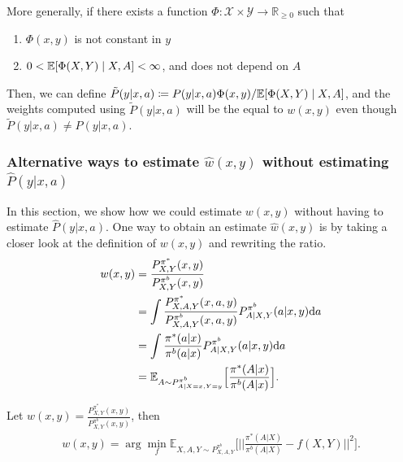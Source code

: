 More generally, if there exists a function $\Phi: \mathcal{X}\times \mathcal{Y} \rightarrow \mathbb{R}_{\geq0}$ such that 
\begin{enumerate}
    \item $\Phi(x, y)$ is not constant in $y$
    \item $0<\mathbb{E}[\Phi(X,Y) \mid X, A]< \infty$, and does not depend on $A$
\end{enumerate}
Then, we can define $\tilde{P}(y|x, a) \coloneqq P(y|x, a) \Phi(x, y)/\mathbb{E}[\Phi(X,Y) \mid X, A]$, and the weights computed using $\tilde{P}(y|x, a)$ will be the equal to $w(x, y)$ even though $\tilde{P}(y|x, a) \ne P(y|x, a)$.
\subsubsection{Alternative ways to estimate $\hat{w}(x, y)$ without estimating $\hat{P}(y| x, a)$}\label{sec:alternate_weights_est}
In this section, we show how we could estimate $w(x, y)$ without having to estimate $\hat{P}(y|x, a)$. One way to obtain an estimate $\hat{w}(x, y)$ is by taking a closer look at the definition of $w(x, y)$ and rewriting the ratio.
\begin{align}
    w(x,y)&=\frac{P_{X, Y}^{\pi^*}(x,y)}{P_{X, Y}^{\pi^b}(x,y)} \nonumber\\
    &=\int \frac{P_{X,A, Y}^{\pi^*}(x,a,y)}{P_{X,A, Y}^{\pi^b}(x,a,y)}P_{A|X,Y}^{\pi^b}(a|x,y)\mathrm{d}a \nonumber \\
    &=\int \frac{\pi^{\ast}(a|x)}{\pi^b (a|x)}P_{A|X,Y}^{\pi^b}(a|x,y)\mathrm{d}a \nonumber\\
    &= \mathbb{E}_{A \sim P^{\pi^b}_{A\mid X=x,Y=y}}\Big[ \frac{\pi^{\ast}(A|x)}{\pi^b (A|x)} \Big]. \label{eq:ratioidentity}
\end{align}

\begin{lemma}\label{prop:weights-est}
Let $w(x,y)=\frac{P_{X, Y}^{\pi^*}(x,y)}{P_{X, Y}^{\pi^b}(x,y)}$, then
\begin{align}
    w(x,y) = \arg\min_{f} \mathbb{E}_{X,A,Y \sim P^{\pi^b}_{X,A,Y}} \Big[\Big|\Big|\frac{\pi^{\ast}(A|X)}{\pi^b (A|X)}-f(X,Y)\Big|\Big|^2\Big]. \label{eq:weights-obj}
\end{align}
\end{lemma}

